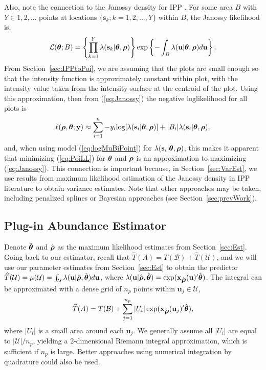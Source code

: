 \documentclass[12pt, titlepage]{article}\usepackage[]{graphicx}\usepackage[]{color}
\newcommand{\bx}{\ensuremath{\mathbf{x}}}
\newcommand{\bs}{\ensuremath{\mathbf{s}}}
\newcommand{\bu}{\ensuremath{\mathbf{u}}}
\def\bs{\mathbf{s}}
\def\bu{\mathbf{u}}
\def\by{\mathbf{y}}
\def\cB{\mathcal{B}}
\def\cU{\mathcal{U}}
\def\cL{\mathcal{L}}
\def\btheta{\mbox{\boldmath $\theta$}}
\def\brho{\mbox{\boldmath $\rho$}}
\def\log{\textrm{log}}
\def\upp{^{\prime}}
\begin{document}
Also, note the connection to the Janossy density for IPP \citep[see, e.g., ][p. 655]{Cres:stat:1993}.  For some area $B$ with $Y \in 1, 2, \dots$ points at locations $\{\bs_k; k = 1, 2, \ldots, Y\}$ within $B$, the Janossy likelihood is,
\begin{equation} \label{eq:Janossy}
  \cL(\btheta;B) = \left\{ \prod_{k=1}^Y \lambda(\bs_k|\btheta,\brho) \right\} 
    \exp \left\{ - \int_B \lambda(\bu|\btheta,\brho)d\bu \right\}.
\end{equation}
From Section~\ref{sec:IPPtoPoi}, we are assuming that the plots are small enough so that the intensity function is approximately constant within plot, with the intensity value taken from the intensity surface at the centroid of the plot.  Using this approximation, then from (\ref{eq:Janossy}) the negative loglikelihood for all plots is
\[
 \ell(\brho,\btheta;\by) \approx \sum_{i=1}^n - y_i \log[\lambda(\bs_i|\btheta,\brho)] + |B_i|\lambda(\bs_i|\btheta,\brho), 
\]
and, when using model (\ref{eq:logMuBiPoint}) for $\lambda(\bs_i|\btheta,\brho)$, this makes it apparent that minimizing (\ref{eq:PoiLL}) for $\btheta$ and $\brho$ is an approximation to maximizing (\ref{eq:Janossy}).  This connection is important because, in Section~\ref{sec:VarEst}, we use results from maximum likelihood estimation of the Janossy density in IPP literature to obtain variance estimates.  Note that other approaches may be taken, including penalized splines \citep{Rupp:Wand:Carr:semi:2003} or Bayesian approaches (see Section~\ref{sec:prevWork}).

\subsection{Plug-in Abundance Estimator}

Denote $\hat{\btheta}$ and $\hat{\brho}$ as the maximum likelihood estimates from Section~\ref{sec:Est}. Going back to our estimator, recall that $\widehat{T}(A) = T(\cB) + \widehat{T}(\cU)$, and we will use our parameter estimates from Section~\ref{sec:Est} to obtain the predictor $\widehat{T}(\cU) =\mu(\cU)=\int_\cU \lambda(\bu|\hat{\brho},\hat{\btheta})d\bu$, where $\lambda(\bu|\hat{\brho},\hat{\btheta}) = \exp(\bx_{\hat{\brho}}(\bu)\upp\hat{\btheta})$. The integral can be approximated with a dense grid of $n_p$ points within $\bu_j \in \cU$,
\begin{equation} \label{eq:ThatA}
  \widehat{T}(A) = T(\cB) + \sum_{j=1}^{n_p}|U_i|\exp(\bx_{\hat{\brho}}(\bu_j)\upp\hat{\btheta}),
\end{equation}
where $|U_i|$ is a small area around each $\bu_j$.  We generally assume all $|U_i|$ are equal to $|\cU|/n_p$, yielding a 2-dimensional Riemann integral approximation, which is sufficient if $n_p$ is large.  Better approaches using numerical integration by quadrature could also be used.
\end{document}
